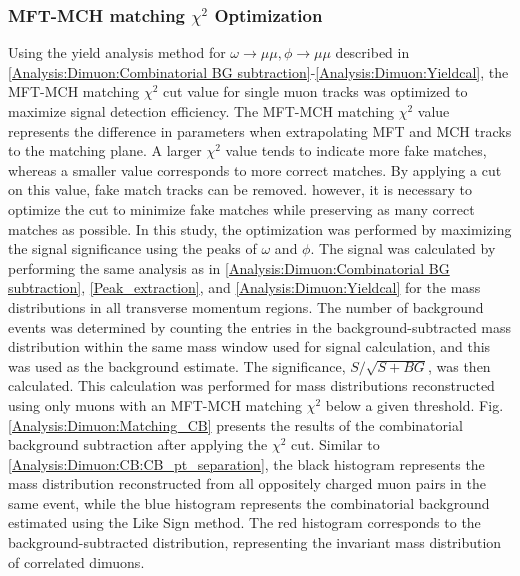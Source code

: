         \subsubsection{MFT-MCH matching $\chi^2$ Optimization}
        \label{matching_chi2_opt}
            Using the yield analysis method for \(\omega \rightarrow \mu\mu, \phi \rightarrow \mu\mu\) described in \ref{Analysis:Dimuon:Combinatorial BG subtraction}-\ref{Analysis:Dimuon:Yieldcal}, the MFT-MCH matching \(\chi^2\) cut value for single muon tracks was optimized to maximize signal detection efficiency. The MFT-MCH matching \(\chi^2\) value represents the difference in parameters when extrapolating MFT and MCH tracks to the matching plane. A larger \(\chi^2\) value tends to indicate more fake matches, whereas a smaller value corresponds to more correct matches. By applying a cut on this value, fake match tracks can be removed. however, it is necessary to optimize the cut to minimize fake matches while preserving as many correct matches as possible. In this study, the optimization was performed by maximizing the signal significance using the peaks of \(\omega\) and \(\phi\).\@
            The signal was calculated by performing the same analysis as in \ref{Analysis:Dimuon:Combinatorial BG subtraction}, \ref{Peak_extraction}, and \ref{Analysis:Dimuon:Yieldcal} for the mass distributions in all transverse momentum regions. The number of background events was determined by counting the entries in the background-subtracted mass distribution within the same mass window used for signal calculation, and this was used as the background estimate. The significance, \( S/\sqrt{S+BG} \), was then calculated. This calculation was performed for mass distributions reconstructed using only muons with an MFT-MCH matching \(\chi^2\) below a given threshold.  
            Fig. \ref{Analysis:Dimuon:Matching_CB} presents the results of the combinatorial background subtraction after applying the \(\chi^2\) cut. Similar to \ref{Analysis:Dimuon:CB:CB_pt_separation}, the black histogram represents the mass distribution reconstructed from all oppositely charged muon pairs in the same event, while the blue histogram represents the combinatorial background estimated using the Like Sign method. The red histogram corresponds to the background-subtracted distribution, representing the invariant mass distribution of correlated dimuons.
